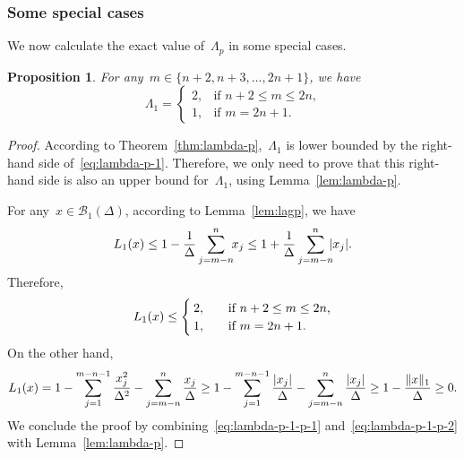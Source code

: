 \documentclass[draft]{article}
\numberwithin{equation}{section}
\theoremstyle{definition}
\theoremstyle{plain}
\newtheorem{proposition}{Proposition}[section]
\theoremstyle{remark}
\newcommand*{\abs}[2][]{#1\lvert#2#1\rvert}
\newcommand*{\lagp}[1][]{L\ifblank{#1}{}{_{#1}}}
\newcommand*{\norm}[2][]{#1\lVert#2#1\rVert}
\newcommand*{\set}[2][]{#1\{#2#1\}}
\begin{document}
\subsubsection{Some special cases}

We now calculate the exact value of~$\Lambda_p$ in some special cases.

\begin{proposition}
    \label{prop:lambda-p-1}
    For any~$m \in \set{n + 2, n + 3, \dots, 2n + 1}$, we have
    \begin{equation}
        \label{eq:lambda-p-1}
        \Lambda_1 =
        \begin{cases}
            2,  & \text{if~$n + 2 \le m \le 2n$,}\\
            1,  & \text{if $m = 2n+1$.}
        \end{cases}
    \end{equation}
\end{proposition}

\begin{proof}
    According to Theorem~\ref{thm:lambda-p},~$\Lambda_1$ is lower bounded by the right-hand side of~\eqref{eq:lambda-p-1}.
    Therefore, we only need to prove that this right-hand side is also an upper bound for~$\Lambda_1$, using Lemma~\ref{lem:lambda-p}.

    For any~$x \in \mathcal{B}_1(\Delta)$, according to Lemma~\ref{lem:lagp}, we have
    \begin{equation*}
        \lagp[1](x) \le 1 - \frac{1}{\Delta} \sum_{j = m - n}^n \!\! x_j \le 1 + \frac{1}{\Delta} \sum_{j = m - n}^n \!\! \abs{x_j}.
    \end{equation*}
    Therefore,
    \begin{equation}
        \label{eq:lambda-p-1-p-1}
        \lagp[1](x) \le
        \begin{cases}
            2,  & \quad \text{if~$n + 2 \le m \le 2n$,}\\
            1,  & \quad \text{if~$m = 2n+1$.}
        \end{cases}
    \end{equation}
    On the other hand,
    \begin{equation}
        \label{eq:lambda-p-1-p-2}
        \lagp[1](x) = 1 - \sum_{j = 1}^{m - n - 1} \frac{x_j^2}{\Delta^2} - \sum_{j = m - n}^n \frac{x_j}{\Delta} \ge 1 - \sum_{j = 1}^{m - n - 1} \frac{\abs{x_j}}{\Delta} - \sum_{j = m - n}^n \frac{\abs{x_j}}{\Delta} \ge 1 - \frac{\norm{x}_1}{\Delta} \ge 0.
    \end{equation}
    We conclude the proof by combining~\eqref{eq:lambda-p-1-p-1} and~\eqref{eq:lambda-p-1-p-2} with Lemma~\ref{lem:lambda-p}.
\end{proof}
\end{document}
